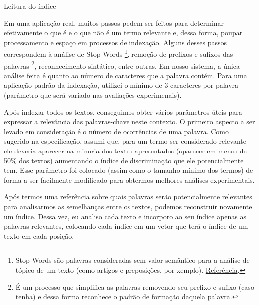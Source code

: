 \documentclass[12pt]{article}
\begin{document}
\begin{algorithm}[h!]
\begin{footnotesize}
\caption{Leitura do índice}
\end{footnotesize}
\end{algorithm}

Em uma aplicação real, muitos passos podem ser feitos para determinar
efetivamente o que é e o que não é um termo relevante e, dessa forma, poupar
processamento e espaço em processos de indexação. Alguns desses passos
correspondem à análise de Stop Words \footnote{Stop Words são palavras consideradas sem valor
semântico para a análise de tópico de um texto (como artigos e preposições, por
xemplo). \href{http://searchenginewatch.com/2156061}{Referência}.}, remoção de
prefixos e sufixos das palavras \footnote{É um processo que simplifica as
palavras removendo seu prefixo e sufixo (caso tenha) e dessa forma reconhece o
padrão de formação daquela palavra.}, reconhecimento sintático, entre outras. 
Em nosso sistema, a única análise feita é quanto ao número de caracteres que a 
palavra contém. Para uma aplicação padrão da indexação, utilizei o mínimo de 3 
caracteres por palavra (parâmetro que será variado nas avaliações experimenais).

Após indexar todos os textos, conseguimos obter vários parâmetros úteis para
expressar a relevância das palavras-chave neste contexto. O primeiro aspecto a ser
levado em consideração é o número de ocorrências de uma palavra. Como sugerido
na especificação, assumi que, para um termo ser considerado relevante ele
deveria aparecer na minoria dos textos apresentados (aparecer em menos de 50\%
dos textos) aumentando o índice de discriminação que ele potencialmente tem.
Esse parâmetro foi colocado (assim como o tamanho mínimo dos termos) de forma a
ser facilmente modificado para obtermos melhores análises experimentais.

Após termos uma referência sobre quais palavras serão potencialmente relevantes
para analisarmos as semelhanças entre os textos, podemos reconstruir novamente
um índice. Dessa vez, eu analiso cada texto e incorporo ao seu índice apenas as
palavras relevantes, colocando cada índice em um vetor que terá o índice de um texto 
em cada posição.
\end{document}
